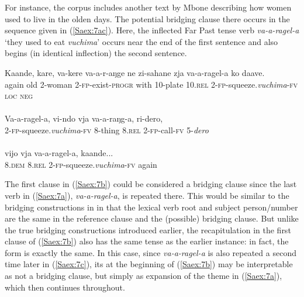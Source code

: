 \documentclass[output=paper]{LSP/langsci}
\begin{document}
For instance, the corpus includes another text by Mbone describing how women used to live in the olden days. The potential bridging clause there occurs in the sequence given in (\ref{Saex:7ac}). Here, the inflected Far Past tense verb \textit{va-a-ragel-a} `they used to eat \textit{vuchima}' occurs near the end of the first  sentence and also begins (in identical inflection) the second sentence. 
 
\begin{exe}
\ex \label{Saex:7ac}
\begin{xlist}
\ex \label{Saex:7a}
\gll Kaande,  kare,  va-kere   va-a-r-aŋge     ne   zi-sahane  zja   va-a-ragel-a       ko   daave. \\
again    old  2-woman  2-\textsc{fp}-exist-\textsc{progr}  with  10-plate  10.\textsc{rel}  2-\textsc{fp}-squeeze.\textit{vuchima}-\textsc{fv}  \textsc{loc}  \textsc{neg}\\
\glt {}\\
\ex \label{Saex:7b}
\gll Va-a-ragel-a,       vi-ndo   vja   va-a-raŋg-a,  ri-dero,  \\     	       
   2-\textsc{fp}-squeeze.\textit{vuchima}-\textsc{fv} 8-thing  8.\textsc{rel}  2-\textsc{fp-}call-\textsc{fv}  5-\textit{dero}  \\
   \glt {} \\
\ex \label{Saex:7c}
\gll vijo   vja   va-a-ragel-a,       kaande...\\     	       
    8.\textsc{dem}  8.\textsc{rel}  2-\textsc{fp}-squeeze.\textit{vuchima}-\textsc{fv}  again\\
\glt {} 
\end{xlist}
\end{exe}



The first clause in (\ref{Saex:7b}) could be considered a bridging clause since the last verb in (\ref{Saex:7a}), \textit{va-a-ragel-a}, is repeated there. This would be similar to the bridging constructions in  in that the lexical verb root and subject person/number are the same in the reference clause and the (possible) bridging clause. But unlike the true bridging constructions introduced earlier, the recapitulation in the first clause of (\ref{Saex:7b}) also has the same tense as the earlier instance: in fact, the form is exactly the same. In this case, since \textit{va-a-ragel-a} is also repeated a second time later in (\ref{Saex:7c}), its  at the beginning of (\ref{Saex:7b}) may be interpretable as not a bridging clause, but simply as expansion of the theme in (\ref{Saex:7a}), which then continues throughout. 
\end{document}
